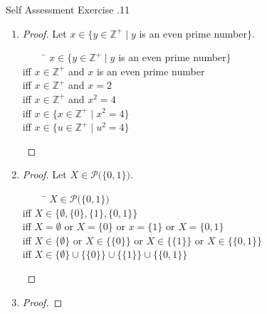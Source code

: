 \documentclass[\main/notes.tex]{subfiles}
\begin{document}
			\pagebreak
			\begin{exercise}{Self Assessment Exercise \thechapter.11}
				\begin{enumerate}
					\item {}
						\begin{proof}
							Let $x \in \{y \in \mathbb{Z}^{+} \mid y$ is an even prime number$\}$.
							\begin{tabbing}
								$\qquad$ \= $x \in \{y \in \mathbb{Z}^{+} \mid y$ is an even prime number$\}$\\
								iff      \> $x \in \mathbb{Z}^{+}$ and $x$ is an even prime number\\
								iff      \> $x \in \mathbb{Z}^{+}$ and $x = 2$\\
								iff      \> $x \in \mathbb{Z}^{+}$ and $x^{2} = 4$\\
								iff      \> $x \in \{x \in \mathbb{Z}^{+} \mid x^{2} = 4\}$\\
								iff      \> $x \in \{u \in \mathbb{Z}^{+} \mid u^{2} = 4\}$
							\end{tabbing}
						\end{proof}
					\item \question{$\mathcal{P}\bigl(\{0, 1\}\bigr) = \{\emptyset\} \cup \bigl\{\{0\}\bigr\} \cup \bigl\{\{1\}\bigr\} \cup \bigl\{\{0, 1\}\bigr\}$}
						\begin{proof}
							Let $X \in \mathcal{P}\bigl(\{0, 1\}\bigr)$.
							\begin{tabbing}
								$\qquad$ \= $X \in \mathcal{P}\bigl(\{0, 1\}\bigr)$\\
								iff \> $X \in \bigl\{\emptyset, \{0\}, \{1\}, \{0, 1\}\bigr\}$\\
								iff \> $X = \emptyset$ or $X = \{0\}$ or $x = \{1\}$ or $X = \{0, 1\}$\\
								iff \> $X \in \{\emptyset\}$ or $X \in \bigl\{\{0\}\bigr\}$ or $X \in \bigl\{\{1\}\bigr\}$ or $X \in \bigl\{\{0, 1\}\bigr\}$\\
								iff \> $X \in \{\emptyset\} \cup \bigl\{\{0\}\bigr\} \cup \bigl\{\{1\}\bigr\} \cup \bigl\{\{0, 1\}\bigr\}$
							\end{tabbing}
						\end{proof}
					\item {}
						\begin{proof}

\end{proof}
\end{enumerate}
\end{exercise}
\end{document}
